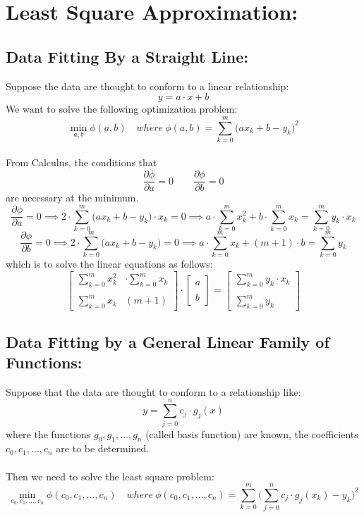 \documentclass [9 pt]{article}
\theoremstyle{definition}
\begin{document}
\section*{Least Square Approximation: }

\subsection*{Data Fitting By a Straight Line:}
Suppose the data are thought to conform to a linear relationship:
$$ y = a\cdot x + b$$
We want to solve the following optimization problem:
$$ \min_{a, b} \phi(a, b) \quad where\ \phi(a, b) = \sum_{k = 0}^m \Big( ax_k + b - y_k \Big)^2 $$
\\
From Calculus, the conditions that
$$ \dfrac{\partial\phi}{\partial a} = 0 \quad \quad \dfrac{\partial\phi}{\partial b} = 0 $$
are necessary at the minimum.
$$ \dfrac{\partial\phi}{\partial a} = 0 \implies 2 \cdot \sum_{k = 0}^m \Big( ax_k + b - y_k \Big) \cdot x_k = 0  \implies  a \cdot \sum_{k = 0}^m x_k^2 + b \cdot \sum_{k = 0}^m x_k = \sum_{k = 0}^m y_k \cdot x_k   $$
$$ \dfrac{\partial\phi}{\partial b} = 0 \implies 2 \cdot \sum_{k = 0}^m \Big( ax_k + b - y_k \Big)  = 0 \implies  a \cdot \sum_{k = 0}^m x_k + (m+1) \cdot b = \sum_{k = 0}^m y_k$$
which is to solve the linear equations as follows:
$$
\begin{bmatrix}
	\sum_{k = 0}^m x_k^2 & \cdot \sum_{k = 0}^m x_k\\
	\\
	\sum_{k = 0}^m x_k & (m+1)  
\end{bmatrix} \cdot
\begin{bmatrix}
	a\\
	\\
	b
\end{bmatrix} = 
\begin{bmatrix}
	\sum_{k = 0}^m y_k \cdot x_k \\
	\\
	 \sum_{k = 0}^m y_k
\end{bmatrix}
$$


\newpage
\subsection*{Data Fitting by a General Linear Family of Functions:}
Suppose that the data are thought to conform to a relationship like:
$$ y = \sum_{j = 0}^{n} c_j\cdot g_j(x) $$
where the functions $g_0, g_1, \ldots, g_n$ (called basis function) are known, the coefficients $c_0, c_1, \ldots ,c_n$ are to be determined.\\
\\
Then we need to solve the least square problem:
\begin{equation}
	\min_{c_0, c_1, \ldots, c_n} \phi(c_0, c_1, \ldots, c_n) \quad where\ \phi(c_0, c_1, \ldots, c_n) = \sum_{k = 0}^m \Big( \sum_{j = 0}^n c_j \cdot g_j(x_k) - y_k \Big)^2 
\end{equation}
\end{document}
